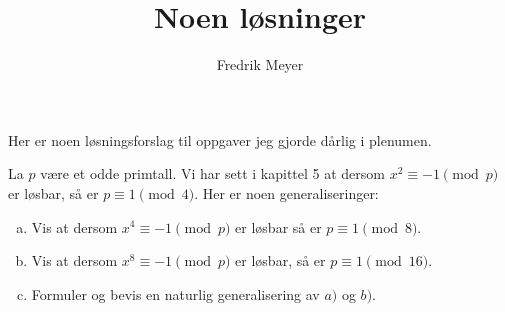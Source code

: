 \documentclass[11pt, norsk]{article}
\title{Noen løsninger}
\author{Fredrik Meyer}
\date{}
\begin{document}
\maketitle

Her er noen løsningsforslag til oppgaver jeg gjorde dårlig i plenumen.

\begin{oppg}[Oppgave 5.7]
La $p$ være et odde primtall. Vi har sett i kapittel 5 at dersom $x^2 \equiv -1 \pmod p$ er løsbar, så er $p \equiv 1 \pmod 4$. Her er noen generaliseringer:
\begin{enumerate}[a)]
\item Vis at dersom $x^4 \equiv -1 \pmod p$ er løsbar så er $p \equiv 1 \pmod 8$. 
\item Vis at dersom $x^8 \equiv -1 \pmod p$ er løsbar, så er $p \equiv 1 \pmod {16}$. 
\item Formuler og bevis en naturlig generalisering av $a)$ og $b)$.
\end{enumerate}
\end{oppg}
\end{document}

